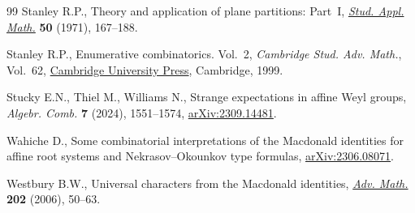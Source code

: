 \documentclass[10pt,a4paper]{amsart}
\numberwithin{equation}{section}
\begin{document}
\begin{thebibliography}{99}
Stanley R.P., Theory and application of plane partitions: {P}art~{I},
 \href{https://doi.org/10.1002/sapm1971502167}{\textit{Stud. Appl. Math.}} \textbf{50} (1971), 167--188.

Stanley R.P., Enumerative combinatorics. {V}ol.~2, \textit{Cambridge Stud. Adv.
 Math.}, Vol.~62, \href{https://doi.org/10.1017/CBO9780511609589}{Cambridge University Press}, Cambridge, 1999.

Stucky E.N., Thiel M., Williams N., Strange expectations in affine {W}eyl
 groups, \textit{Algebr. Comb.} \textbf{7} (2024), 1551--1574,
 \href{https://arxiv.org/abs/2309.14481}{arXiv:2309.14481}.

Wahiche D., Some combinatorial interpretations of the Macdonald identities for
 affine root systems and Nekrasov--Okounkov type formulas,
 \href{https://arxiv.org/abs/2306.08071}{arXiv:2306.08071}.

Westbury B.W., Universal characters from the {M}acdonald identities,
 \href{https://doi.org/10.1016/j.aim.2005.03.013}{\textit{Adv. Math.}} \textbf{202} (2006), 50--63.

\end{thebibliography}
\end{document}
